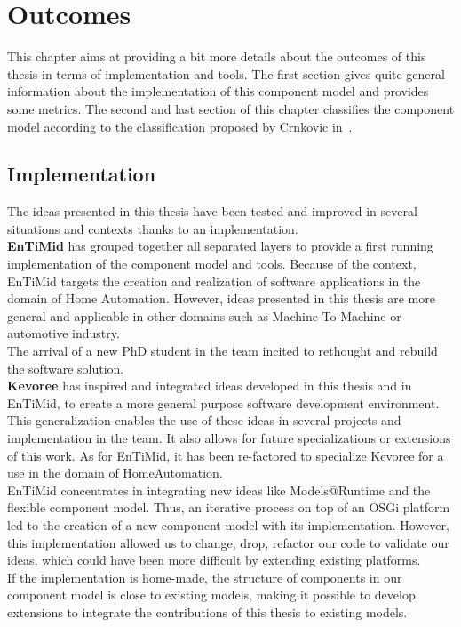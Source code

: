 \chapter{Outcomes}
\label{ch:outcomes}

This chapter aims at providing a bit more details about the outcomes of this thesis in terms of implementation and tools. The first section gives quite general information about the implementation of this component model and provides some metrics. The second and last section of this chapter classifies the component model according to the classification proposed by Crnkovic in~\cite{Crnkovic_1374:2007}.

\section{Implementation}

The ideas presented in this thesis have been tested and improved in several situations and contexts thanks to an implementation.\\

{\bf EnTiMid} has grouped together all separated layers to provide a first running implementation of the component model and tools. Because of the context, EnTiMid targets the creation and realization of software applications in the domain of Home Automation. However, ideas presented in this thesis are more general and applicable in other domains such as Machine-To-Machine or automotive industry.\\
The arrival of a new PhD student in the team incited to rethought and rebuild the software solution.\\

{\bf Kevoree} has inspired and integrated ideas developed in this thesis and in EnTiMid, to create a more general purpose software development environment. This generalization enables the use of these ideas in several projects and implementation in the team. It also allows for future specializations or extensions of this work. As for EnTiMid, it has been re-factored to specialize Kevoree for a use in the domain of HomeAutomation.\\

EnTiMid concentrates in integrating new ideas like Models@Runtime and the flexible component model. Thus, an iterative process on top of an OSGi platform led to the creation of a new component model with its implementation. However, this implementation allowed us to change, drop, refactor our code to validate our ideas, which could have been more difficult by extending existing platforms.\\
If the implementation is home-made, the structure of components in our component model is close to existing models, making it possible to develop extensions to integrate the contributions of this thesis to existing models.\\


